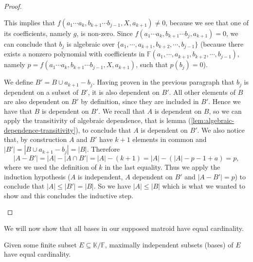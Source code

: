 \begin{proof}
\begin{enumerate}
		      This implies that $f(a _1 \cdots a _k, b _{k + 1} \cdots b _{j - 1}, X, a _{k + 1}) \neq 0$, because we see that one of its coefficients, namely $g$, is non-zero. Since $ f(a _1 \cdots a _{k}, b _{k + 1} \cdots b _{j}, a _{k + 1})  = 0$, we can conclude that $b_j$ is algebraic over $\{a _1, \cdots, a _{k + 1}, b _{k + 2} ,\cdots,b_{j-1}\}$ (because there exists a nonzero polynomial with coefficients in $\mathbb{F}(a _1, \cdots, a _{k + 1}, b _{k + 2} ,\cdots,b_{j-1})$, namely $p = f(a _1 \cdots a _k, b _{k + 1} \cdots b _{j - 1}, X, a _{k + 1})$, such that $p(b_j) = 0$).

		We define $B' = B \cup a _{k + 1} - b_j$. Having proven in the previous paragraph that $b_j$ is dependent on a subset of $B'$, it is also dependent on $B'$. All other elements of $B$ are also dependent on $B'$ by definition, since they are included in $B'$. Hence we have that $B$ is dependent on $B'$. We recall that $A$ is dependent on $B$, so we can apply the transitivity of algebraic dependence, that is lemma (\ref{lem:algebraic-dependence-transitivity}), to conclude that $A$ is dependent on $B'$. We also notice that, by construction $A$ and $B'$ have $k + 1$ elements in common and $|B'| = |B \cup a_{k+1} - b_j| = |B|$. Therefore $$|A - B'| = |A| - |A\cap B'| = |A| - (k+1) = |A| - (|A| - p - 1 + a) = p, $$ where we used the definition of $k$ in the last equality. Thus we apply the induction hypothesis ($A$ is independent, $A$ dependent on $B'$ and $|A-B'| = p$) to conclude that $|A|\leq |B'| = |B|$. So we have $|A|\leq |B|$ which is what we wanted to show and this concludes the inductive step.
	\end{enumerate}
\end{proof}

We will now show that all bases in our supposed matroid have equal cardinality.

\begin{lemma}\label{lem:algebraic-matroid-equal-size-bases}
	Given some finite subset $E \subseteq \mathbb K / \mathbb F$, maximally independent subsets (bases) of $E$ have equal cardinality.
\end{lemma}

